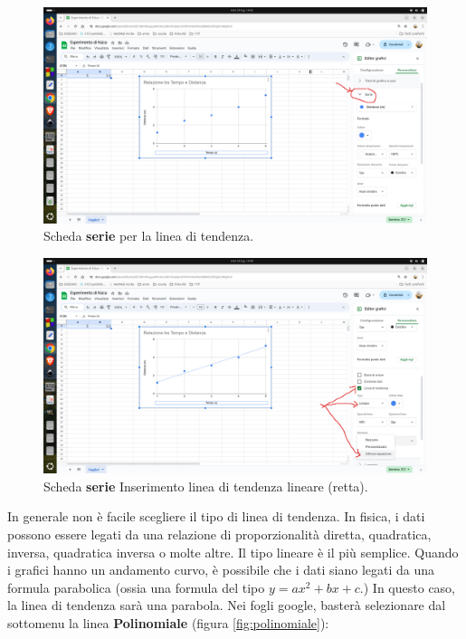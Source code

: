 \documentclass[12pt,a4paper,oneside]{book}
\theoremstyle{esercizio}
\begin{document}
\begin{enumerate}
\begin{figure}[h!]
    \centering
    \includegraphics[width=\linewidth]{img/serie.png} 
    \caption{Scheda \textbf{serie} per la linea di tendenza.}
    \label{fig:serie}
\end{figure}    
  \begin{figure}[h!]
    \centering
    \includegraphics[width=\linewidth]{img/tendenza.png} 
    \caption{Scheda \textbf{serie} Inserimento linea di tendenza lineare (retta).}
    \label{fig:tendenza}
\end{figure}    
   In generale non è facile scegliere il tipo di linea di tendenza. In fisica, i dati possono essere legati da una relazione di proporzionalità diretta, quadratica, inversa, quadratica inversa o molte altre. Il tipo lineare è il più semplice. Quando i grafici hanno un andamento curvo, è possibile che i dati siano legati da una formula parabolica (ossia una formula del tipo $y=ax^2 +bx +c$.) In questo caso, la linea di tendenza sarà una parabola. Nei fogli google, basterà selezionare dal sottomenu la linea \textbf{Polinomiale} (figura \ref{fig:polinomiale}):
   \begin{figure}[h!]

\end{figure}
\end{enumerate}
\end{document}
